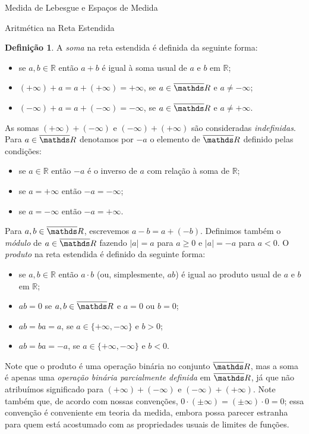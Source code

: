 \documentclass[oneside,final,11pt]{amsbook}
\newcommand{\R}{\mathds R}
\theoremstyle{remark}\newtheorem{exercise}{Exercício}[chapter]
\theoremstyle{remark}\newtheorem{*exercise}[exercise]{\hbox to 0pt{\hskip 0pt minus 1fil*}Exercício}
\theoremstyle{definition}\newtheorem{exdefin}{Definição}[chapter]
\theoremstyle{plain}\newtheorem{teo}{Teorema}[section]
\theoremstyle{plain}\newtheorem{lem}[teo]{Lema}
\theoremstyle{plain}\newtheorem{prop}[teo]{Proposição}
\theoremstyle{plain}\newtheorem{cor}[teo]{Corolário}
\theoremstyle{definition}\newtheorem{defin}[teo]{Definição}
\theoremstyle{remark}\newtheorem{rem}[teo]{Observação}
\theoremstyle{definition}\newtheorem{notation}[teo]{Notação}
\theoremstyle{definition}\newtheorem{convention}[teo]{Convenção}
\theoremstyle{definition}\newtheorem{example}[teo]{Exemplo}
\numberwithin{section}{chapter}
\numberwithin{equation}{section}
\begin{document}
\begin{chapter}{Medida de Lebesgue e Espaços de Medida}
\begin{section}{Aritmética na Reta Estendida}
\begin{defin}
A {\em soma\/} na reta estendida é definida da seguinte forma:
\begin{itemize}
\item se $a,b\in\R$ então $a+b$ é igual à soma usual de $a$ e $b$ em $\R$;
\item $(+\infty)+a=a+(+\infty)=+\infty$, se $a\in\overline\R$ e $a\ne-\infty$;
\item $(-\infty)+a=a+(-\infty)=-\infty$, se $a\in\overline\R$ e $a\ne+\infty$.
\end{itemize}
As somas $(+\infty)+(-\infty)$ e $(-\infty)+(+\infty)$ são consideradas {\em indefinidas}.
Para $a\in\overline\R$ denotamos por $-a$ o elemento de $\overline\R$ definido pelas condições:
\begin{itemize}
\item se $a\in\R$ então $-a$ é o inverso de $a$ com relação à soma de $\R$;
\item se $a=+\infty$ então $-a=-\infty$;
\item se $a=-\infty$ então $-a=+\infty$.
\end{itemize}
Para $a,b\in\overline\R$, escrevemos $a-b=a+(-b)$.
Definimos também o {\em módulo\/} de $a\in\overline\R$ fazendo
$\vert a\vert=a$ para $a\ge0$ e $\vert a\vert=-a$ para $a<0$.
O {\em produto\/} na reta estendida é definido da seguinte forma:
\begin{itemize}
\item se $a,b\in\R$ então $a\cdot b$ (ou, simplesmente, $ab$)
é igual ao produto usual de $a$ e $b$ em $\R$;
\item $ab=0$ se $a,b\in\overline\R$ e $a=0$ ou $b=0$;
\item $ab=ba=a$, se $a\in\{+\infty,-\infty\}$ e $b>0$;
\item $ab=ba=-a$, se $a\in\{+\infty,-\infty\}$ e $b<0$.
\end{itemize}
\end{defin}
Note que o produto é uma operação binária no conjunto $\overline\R$, mas a soma é apenas uma
{\em operação binária parcialmente definida\/} em $\overline\R$, já que não atribuímos significado
para $(+\infty)+(-\infty)$ e $(-\infty)+(+\infty)$. Note também que, de acordo com nossas convenções,
$0\cdot(\pm\infty)=(\pm\infty)\cdot0=0$; essa convenção é conveniente em teoria da medida, embora possa
parecer estranha para quem está acostumado com as propriedades usuais de limites de funções.


\end{section}
\end{chapter}
\end{document}
